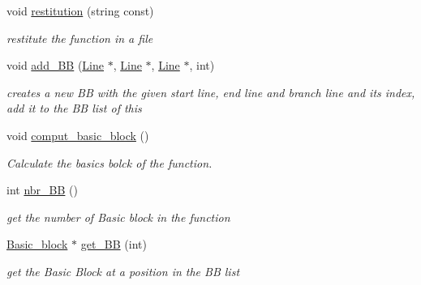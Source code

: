 \begin{DoxyCompactItemize}
void \mbox{\hyperlink{class_function_acd08be840c48abd3c0c0c20ca4b5192a}{restitution}} (string const)
\begin{DoxyCompactList}\small\item\em restitute the function in a file \end{DoxyCompactList}\item 
\mbox{\label{class_function_a5b1550f534becc9b7ae9fe679fc8db10}} 
void \mbox{\hyperlink{class_function_a5b1550f534becc9b7ae9fe679fc8db10}{add\+\_\+\+BB}} (\mbox{\hyperlink{class_line}{Line}} $\ast$, \mbox{\hyperlink{class_line}{Line}} $\ast$, \mbox{\hyperlink{class_line}{Line}} $\ast$, int)
\begin{DoxyCompactList}\small\item\em creates a new BB with the given start line, end line and branch line and its index, add it to the BB list of this \end{DoxyCompactList}\item 
\mbox{\label{class_function_a6094f123294ccbb891fa4145fd5b1b0a}} 
void \mbox{\hyperlink{class_function_a6094f123294ccbb891fa4145fd5b1b0a}{comput\+\_\+basic\+\_\+block}} ()
\begin{DoxyCompactList}\small\item\em Calculate the basics bolck of the function. \end{DoxyCompactList}\item 
\mbox{\label{class_function_a4ddde4ac1ff488dfcbfcaee71f727a48}} 
int \mbox{\hyperlink{class_function_a4ddde4ac1ff488dfcbfcaee71f727a48}{nbr\+\_\+\+BB}} ()
\begin{DoxyCompactList}\small\item\em get the number of Basic block in the function \end{DoxyCompactList}\item 
\mbox{\label{class_function_ae11968b8ca5497526e9448b67823d373}} 
\mbox{\hyperlink{class_basic__block}{Basic\+\_\+block}} $\ast$ \mbox{\hyperlink{class_function_ae11968b8ca5497526e9448b67823d373}{get\+\_\+\+BB}} (int)
\begin{DoxyCompactList}\small\item\em get the Basic Block at a position in the BB list \end{DoxyCompactList}\item 
\mbox{\label{class_function_a1c8830219ce4306c22a933b17f54cc6f}} 

\end{DoxyCompactItemize}
